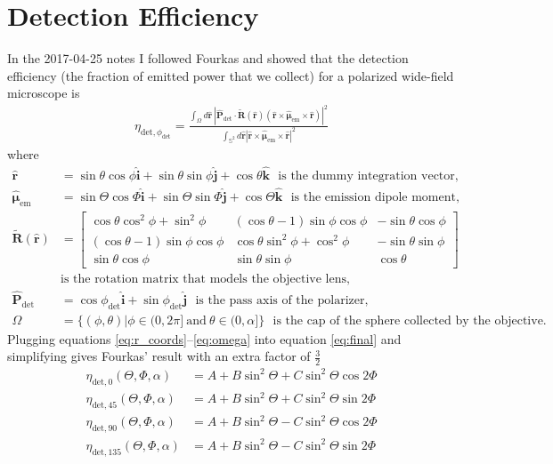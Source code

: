 \documentclass[11pt]{article}
\providecommand{\mb}[1]{\mathbf{#1}}
\providecommand{\mh}[1]{\mathbf{\hat{#1}}}
\providecommand{\bs}[1]{\boldsymbol{#1}}
\begin{document}
\section{Detection Efficiency}
In the 2017-04-25 notes I followed Fourkas and showed that the detection
efficiency (the fraction of emitted power that we collect) for a polarized
wide-field microscope is
\begin{align}
  \eta_{\text{det},\phi_{\text{det}}}  = \frac{\int_{\Omega}d\mh{r}\ \left|\mh{P}_{\text{det}}\cdot\tilde{\mb{R}}(\mh{r})(\mh{r}\times\hat{\bs{\mu}}_{\text{em}}\times\mh{r})\right|^2}{\int_{\mathbb{S}^2}d\mh{r}\left|\mh{r}\times\hat{\bs{\mu}}_{\text{em}}\times\mh{r}\right|^2}\label{eq:final}
\end{align}
where
\begin{align}
  \hat{\mb{r}} &= \sin\theta\cos\phi\hat{\mb{i}} + \sin\theta\sin\phi\hat{\mb{j}} + \cos\theta\hat{\mb{k}}\label{eq:r_coords}\ \ \ \text{is the dummy integration vector,}\\
  \hat{\bs{\mu}}_{\text{em}} &= \sin\Theta\cos\Phi\hat{\mb{i}} + \sin\Theta\sin\Phi\hat{\mb{j}} + \cos\Theta\hat{\mb{k}}\ \ \ \text{is the emission dipole moment,}\label{eq:mu_coords}\\
  \tilde{\mb{R}}(\mh{r}) &= \begin{bmatrix} \cos\theta\cos^2\phi + \sin^2\phi & (\cos\theta -1)\sin\phi\cos\phi & -\sin\theta\cos\phi\\ (\cos\theta - 1)\sin\phi\cos\phi & \cos\theta\sin^2\phi + \cos^2\phi & -\sin\theta\sin\phi \\ \sin\theta\cos\phi& \sin\theta\sin\phi & \cos\theta \end{bmatrix}\label{eq:matrix}\\&\text{is the rotation matrix that models the objective lens,}\\
  \hat{\mb{P}}_{\text{det}} &= \cos\phi_{\text{det}}\hat{\mb{i}} + \sin\phi_{\text{det}}\hat{\mb{j}}\ \ \ \text{is the pass axis of the polarizer,}\\
  \Omega &= \{(\phi, \theta)|\phi \in (0,2\pi]\ \text{and}\ \theta\in (0, \alpha]\}\ \ \ \text{is the cap of the sphere collected by the objective.}\label{eq:omega}
\end{align}
Plugging equations \ref{eq:r_coords}--\ref{eq:omega} into equation \ref{eq:final} and
simplifying gives Fourkas' result with an extra factor of $\frac{3}{2}$
\begin{subequations}
\begin{align}
  \eta_{\text{det},0}(\Theta, \Phi, \alpha) &= A + B\sin^{2}{\Theta} + C\sin^{2}{\Theta} \cos{2 \Phi}\\
  \eta_{\text{det},45}(\Theta, \Phi, \alpha) &= A + B\sin^{2}{\Theta} + C\sin^{2}{\Theta} \sin{2 \Phi}\\
  \eta_{\text{det},90}(\Theta, \Phi, \alpha) &= A + B\sin^{2}{\Theta} - C\sin^{2}{\Theta} \cos{2 \Phi}\\
  \eta_{\text{det},135}(\Theta, \Phi, \alpha) &= A + B\sin^{2}{\Theta} - C\sin^{2}{\Theta} \sin{2 \Phi}
\end{align}\label{eq:int1}
\end{subequations}
\end{document}
